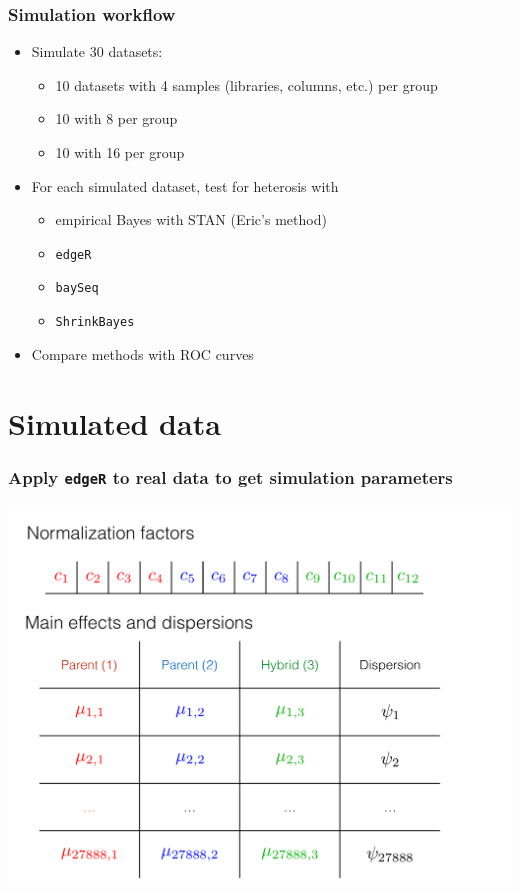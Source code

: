 \documentclass[handout]{beamer}
\numberwithin{equation}{section}
\begin{document}
\begin{frame}
\frametitle{Simulation workflow}

\begin{itemize}
\item Simulate 30 datasets:
\begin{itemize}
\item 10 datasets with 4 samples (libraries, columns, etc.) per group
\item 10 with 8 per group
\item 10 with 16 per group
\end{itemize}
\pause \item For each simulated dataset, test for heterosis with
\begin{itemize}
\item empirical Bayes with STAN (Eric's method)
\item {\tt edgeR} 
\item {\tt baySeq}
\item {\tt ShrinkBayes}
\end{itemize}
\pause \item Compare methods with ROC curves
\end{itemize}
\end{frame}

\section{Simulated data}


\begin{frame}
\frametitle{Apply {\tt edgeR} to real data to get simulation parameters}
\begin{center}
\includegraphics[scale=.25]{parms}
\end{center}
\end{frame}
\end{document}
